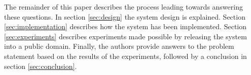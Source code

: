 The remainder of this paper describes the process leading towards answering these questions. In section \ref{sec:design} the system design is explained. Section \ref{sec:implementation} describes how the system has been implemented. Section \ref{sec:experiments} describes experiments made possible by releasing the system into a public domain. Finally, the authors provide answers to the problem statement based on the results of the experiments, followed by a conclusion in section \ref{sec:conclusion}.


